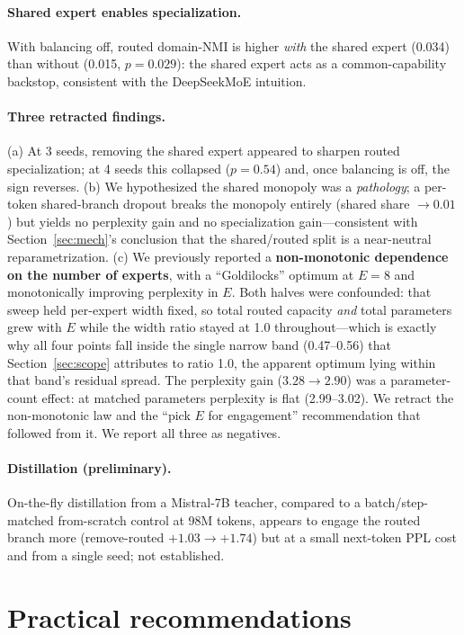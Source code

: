 \documentclass[11pt]{article}
\begin{document}
\paragraph{Shared expert enables specialization.} With balancing off, routed domain-NMI is higher
\emph{with} the shared expert (0.034) than without (0.015, $p=0.029$): the shared expert acts as a
common-capability backstop, consistent with the DeepSeekMoE intuition.

\paragraph{Three retracted findings.} (a) At 3 seeds, removing the shared expert appeared to sharpen
routed specialization; at 4 seeds this collapsed ($p=0.54$) and, once balancing is off, the sign
reverses. (b) We hypothesized the shared monopoly was a \emph{pathology}; a per-token shared-branch
dropout breaks the monopoly entirely (shared share $\rightarrow 0.01$) but yields no perplexity gain
and no specialization gain---consistent with Section~\ref{sec:mech}'s conclusion that the
shared/routed split is a near-neutral reparametrization. (c) We previously reported a
\textbf{non-monotonic dependence on the number of experts}, with a ``Goldilocks'' optimum at
$E{=}8$ and monotonically improving perplexity in $E$. Both halves were confounded: that sweep held
per-expert width fixed, so total routed capacity \emph{and} total parameters grew with $E$ while
the width ratio stayed at 1.0 throughout---which is exactly why all four points fall inside the
single narrow band (0.47--0.56) that Section~\ref{sec:scope} attributes to ratio 1.0, the apparent
optimum lying within that band's residual spread. The perplexity gain ($3.28\rightarrow2.90$) was a
parameter-count effect: at matched parameters perplexity is flat (2.99--3.02). We retract the
non-monotonic law and the ``pick $E$ for engagement'' recommendation that followed from it. We
report all three as negatives.

\paragraph{Distillation (preliminary).} On-the-fly distillation from a Mistral-7B teacher, compared
to a batch/step-matched from-scratch control at 98M tokens, appears to engage the routed branch more
(remove-routed $+1.03\rightarrow+1.74$) but at a small next-token PPL cost and from a single seed;
not established.

\section{Practical recommendations}
\end{document}
